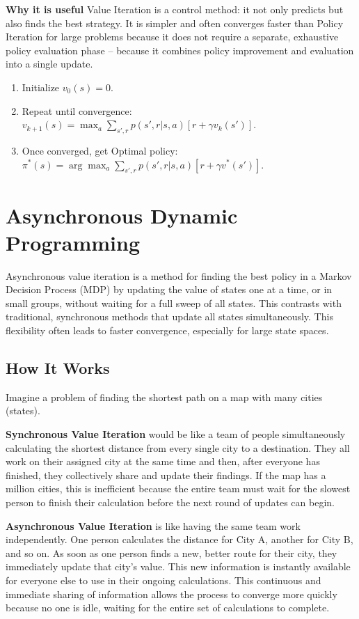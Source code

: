 \documentclass[12pt]{article}
\begin{document}
\textbf{Why it is useful}
Value Iteration is a control method: it not only predicts but also finds the best strategy. It is simpler and often converges faster than Policy Iteration for large problems because it does not require a separate, exhaustive policy evaluation phase -- because it combines policy improvement and evaluation into a single update.\\ 

\begin{enumerate}
    \item Initialize $v_0(s) = 0$.
    \item Repeat until convergence:
    $v_{k+1}(s) = \max_a \sum_{s',r} p(s',r|s,a) [r + \gamma v_k(s')]$.
    \item Once converged, get Optimal policy: $\pi^*(s) = \arg\max_a \sum_{s',r} p(s',r|s,a) [r + \gamma v^*(s')]$.
\end{enumerate}

\section{Asynchronous Dynamic Programming}

Asynchronous value iteration is a method for finding the best policy in a Markov Decision Process (MDP) by updating the value of states one at a time, or in small groups, without waiting for a full sweep of all states. This contrasts with traditional, synchronous methods that update all states simultaneously. This flexibility often leads to faster convergence, especially for large state spaces.

\subsection*{How It Works}
Imagine a problem of finding the shortest path on a map with many cities (states).

\textbf{Synchronous Value Iteration} would be like a team of people simultaneously calculating the shortest distance from every single city to a destination. They all work on their assigned city at the same time and then, after everyone has finished, they collectively share and update their findings. If the map has a million cities, this is inefficient because the entire team must wait for the slowest person to finish their calculation before the next round of updates can begin.

\textbf{Asynchronous Value Iteration} is like having the same team work independently. One person calculates the distance for City A, another for City B, and so on. As soon as one person finds a new, better route for their city, they immediately update that city's value. This new information is instantly available for everyone else to use in their ongoing calculations. This continuous and immediate sharing of information allows the process to converge more quickly because no one is idle, waiting for the entire set of calculations to complete.
\end{document}
